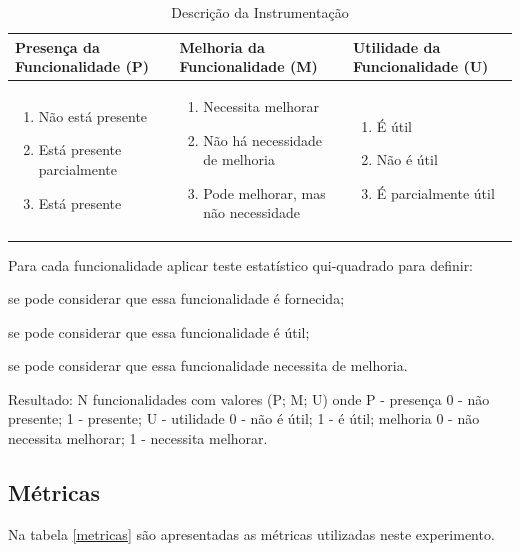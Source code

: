 \begin{table}[ht]
	\centering
	\caption{Descrição da Instrumentação}
	\label{instrumentacao}
	\begin{tabular}{|p{5cm}| p{5cm} | p{5cm}|}
		\hline
		Presença da Funcionalidade (P) & Melhoria da Funcionalidade (M) & Utilidade da Funcionalidade (U)\\
		\hline
		\begin{enumerate}
			\item Não está presente
			\item Está presente parcialmente
			\item Está presente
		\end{enumerate} & 
		\begin{enumerate}
			\item Necessita melhorar
			\item Não há necessidade de melhoria
			\item Pode melhorar, mas não necessidade
		\end{enumerate} &
		\begin{enumerate}
			\item É útil
			\item Não é útil
			\item É parcialmente útil
		\end{enumerate}\\
		\hline
		
	\end{tabular}
\end{table}

Para cada funcionalidade aplicar teste estatístico qui-quadrado para definir:

se pode considerar que essa funcionalidade é fornecida;

se pode considerar que essa funcionalidade é útil;

se pode considerar que essa funcionalidade necessita de melhoria.

Resultado: N funcionalidades com valores (P; M; U) onde P - presença {0 - não presente; 1 - presente}; U - utilidade {0 - não é útil; 1 - é útil}; melhoria {0 - não necessita melhorar; 1 - necessita melhorar}.

\subsection{Métricas}

Na tabela \ref{metricas} são apresentadas as métricas utilizadas neste experimento.

